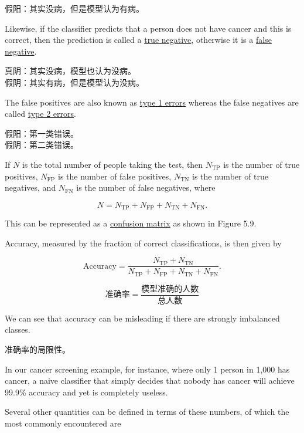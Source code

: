 \documentclass{article}
\begin{document}
{\color{red}
假阳：其实没病，但是模型认为有病。
}

Likewise, if the classifier predicts that a person does not have cancer and this is correct, then the prediction is called a \underline{\color{red}true negative}, otherwise it is a \underline{\color{red}false negative}. 

{\color{red}
真阴：其实没病，模型也认为没病。\\
假阴：其实有病，但是模型认为没病。
}

The false positives are also known as \underline{\color{red}type 1 errors} whereas the false negatives are called \underline{\color{red}type 2 errors}. 

{\color{red}
假阳：第一类错误。\\
假阴：第二类错误。
}

If $N$ is the total number of people taking the test, then $N_{\text{TP}}$ is the number of true positives, $N_{\text{FP}}$ is the number of false positives, $N_{\text{TN}}$ is the number of true negatives, and $N_{\text{FN}}$ is the number of false negatives, where

\begin{equation}
N = N_{\text{TP}} + N_{\text{FP}} + N_{\text{TN}} + N_{\text{FN}}.
\tag{5.28}
\end{equation}

This can be represented as a \underline{\color{red}confusion matrix} as shown in Figure 5.9. 

Accuracy, measured by the fraction of correct classifications, is then given by

\begin{equation}
\text{Accuracy} = \frac{N_{\text{TP}} + N_{\text{TN}}}{N_{\text{TP}} + N_{\text{FP}} + N_{\text{TN}} + N_{\text{FN}}}.
\tag{5.29}
\end{equation}

{\color{red}
$$
\text{准确率} = \frac{\text{模型准确的人数}}{\text{总人数}}
$$
}

We can see that accuracy can be misleading if there are strongly imbalanced classes. 

{\color{red}
准确率的局限性。
}

In our cancer screening example, for instance, where only 1 person in 1,000 has cancer, a naive classifier that simply decides that nobody has cancer will achieve 99.9\% accuracy and yet is completely useless.

Several other quantities can be defined in terms of these numbers, of which the most commonly encountered are
\end{document}
